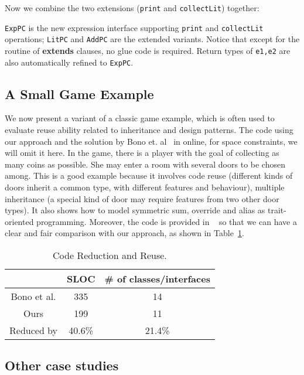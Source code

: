 
\noindent Now we combine the two extensions (\texttt{print} and
\texttt{collectLit}) together:


\noindent \texttt{ExpPC} is the new expression interface supporting
\texttt{print} and \texttt{collectLit} operations; \texttt{LitPC} and
\texttt{AddPC} are the extended variants. Notice that except for the routine of
\textbf{extends} clauses, no glue code is required. Return types of
\texttt{e1,e2} are also automatically refined to \texttt{ExpPC}.

\subsection{A Small Game Example}
We now present a variant of a classic game example, which is often used to
evaluate reuse ability related to inheritance and design patterns. The code
using our approach and the solution by Bono et. al~\cite{bono14} in online, for
space constraints, we will omit it here. In the game, there is a player with the
goal of collecting as many coins as possible. She may enter a room with several
doors to be chosen among. This is a good example because it involves code reuse
(different kinds of doors inherit a common type, with different features and
behaviour), multiple inheritance (a special kind of door may require features
from two other door types). It also shows how to model symmetric sum, override
and alias as trait-oriented programming. Moreover, the code is provided in
~\cite{bono14} so that we can have a clear and fair comparison with our
approach, as shown in Table~\ref{table:codereduction}.

\begin{table}[h]
\centering
\begin{tabular}{ccc}
\hline
            & SLOC   & \# of classes/interfaces \\ \hline
Bono et al. & 335    & 14                       \\
Ours        & 199    & 11                       \\
\rowcolor[HTML]{C0C0C0} 
Reduced by  & 40.6\% & 21.4\%                   \\ \hline
\end{tabular}
\caption{Code Reduction and Reuse.}
\label{table:codereduction}
\end{table}


\subsection{Other case studies}
